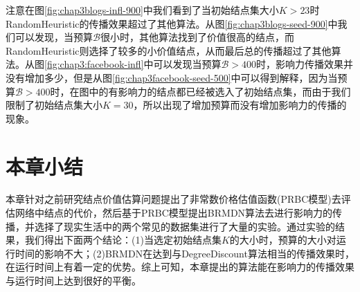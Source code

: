 注意在图\ref{fig:chap3blogs-infl-900}中我们看到了当初始结点集大小$K>23$时RandomHeuristic的传播效果超过了其他算法。从图\ref{fig:chap3blogs-seed-900}中我们可以发现，当预算$\mathcal{B}$很小时，其他算法找到了价值很高的结点，而RandomHeuristic则选择了较多的小价值结点，从而最后总的传播超过了其他算法。从图\ref{fig:chap3:facebook-infl}中可以发现当预算$\mathcal{B}>400$时，影响力传播效果并没有增加多少，但是从图\ref{fig:chap3facebook-seed-500}中可以得到解释，因为当预算$\mathcal{B}>400$时，在图中的有影响力的结点都已经被选入了初始结点集，而由于我们限制了初始结点集大小$K=30$，所以出现了增加预算而没有增加影响力的传播的现象。


\section{本章小结}
本章针对之前研究结点价值估算问题提出了非常数价格估值函数(PRBC模型)去评估网络中结点的代价，然后基于PRBC模型提出BRMDN算法去进行影响力的传播，并选择了现实生活中的两个常见的数据集进行了大量的实验。通过实验的结果，我们得出下面两个结论：(1)当选定初始结点集$K$的大小时，预算的大小对运行时间的影响不大；(2)BRMDN在达到与DegreeDiscount算法相当的传播效果时，在运行时间上有着一定的优势。综上可知，本章提出的算法能在影响力的传播效果与运行时间上达到很好的平衡。